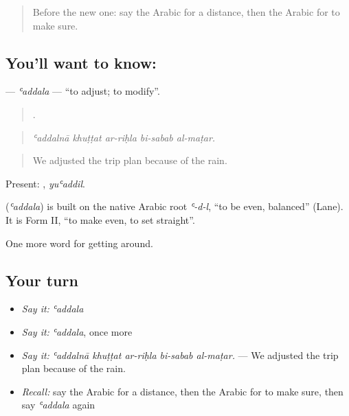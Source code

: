 \begin{quote}
Before the new one: say the Arabic for a distance, then the Arabic for to make sure.
\end{quote}

\subsection*{You'll want to know: }
\textbf{} — \emph{ʿaddala} — \textquotedblleft{}to adjust; to modify\textquotedblright{}.

\begin{quote}
    .
\end{quote}

\begin{quote}
\emph{ʿaddalnā khuṭṭat ar-riḥla bi-sabab al-maṭar.}
\end{quote}

\begin{quote}
We adjusted the trip plan because of the rain.
\end{quote}

Present: , \emph{yuʿaddil}.

\begin{cousinweb}
\textbf{} (\emph{ʿaddala}) is built on the native Arabic root \emph{ʿ-d-l}, \textquotedblleft{}to be even, balanced\textquotedblright{} (Lane). It is Form II, \textquotedblleft{}to make even, to set straight\textquotedblright{}.
\end{cousinweb}

\begin{grammarlens}[title={What you've built}]
One more word for getting around.
\end{grammarlens}

\subsection*{Your turn}
\begin{itemize}
\raggedright
  \item \emph{Say it:} \emph{ʿaddala}
  \item \emph{Say it:} \emph{ʿaddala}, once more
  \item \emph{Say it:} \emph{ʿaddalnā khuṭṭat ar-riḥla bi-sabab al-maṭar.} — We adjusted the trip plan because of the rain.
  \item \emph{Recall:} say the Arabic for a distance, then the Arabic for to make sure, then say \emph{ʿaddala} again
\end{itemize}

